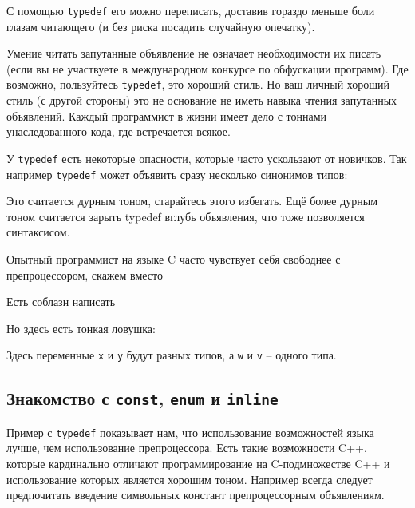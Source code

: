 \documentclass[a4paper,12pt,oneside]{article}
\begin{document}
С помощью \lstinline!typedef! его можно переписать, доставив гораздо меньше боли глазам читающего (и без риска посадить случайную опечатку).



Умение читать запутанные объявление не означает необходимости их писать (если вы не участвуете в международном конкурсе по обфускации программ). Где возможно, пользуйтесь \lstinline!typedef!, это хороший стиль. Но ваш личный хороший стиль (с другой стороны) это не основание не иметь навыка чтения запутанных объявлений. Каждый программист в жизни имеет дело с тоннами унаследованного кода, где встречается всякое.

У \lstinline!typedef! есть некоторые опасности, которые часто ускользают от новичков. Так например \lstinline!typedef! может объявить сразу несколько синонимов типов:



Это считается дурным тоном, старайтесь этого избегать. Ещё более дурным тоном считается зарыть typedef вглубь объявления, что тоже позволяется синтаксисом.



Опытный программист на языке C часто чувствует себя свободнее с препроцессором, скажем вместо



Есть соблазн написать



Но здесь есть тонкая ловушка:



Здесь переменные \lstinline!x! и \lstinline!y! будут разных типов, а \lstinline!w! и \lstinline!v! – одного типа.

\subsection{Знакомство с \lstinline!const!, \lstinline!enum! и \lstinline!inline!}\label{ConstVsDef}

Пример с \lstinline!typedef! показывает нам, что использование возможностей языка лучше, чем использование препроцессора. Есть такие возможности C++, которые кардинально отличают программирование на C-подмножестве C++ и использование которых является хорошим тоном. Например всегда следует предпочитать введение символьных констант препроцессорным объявлениям.
\end{document}
